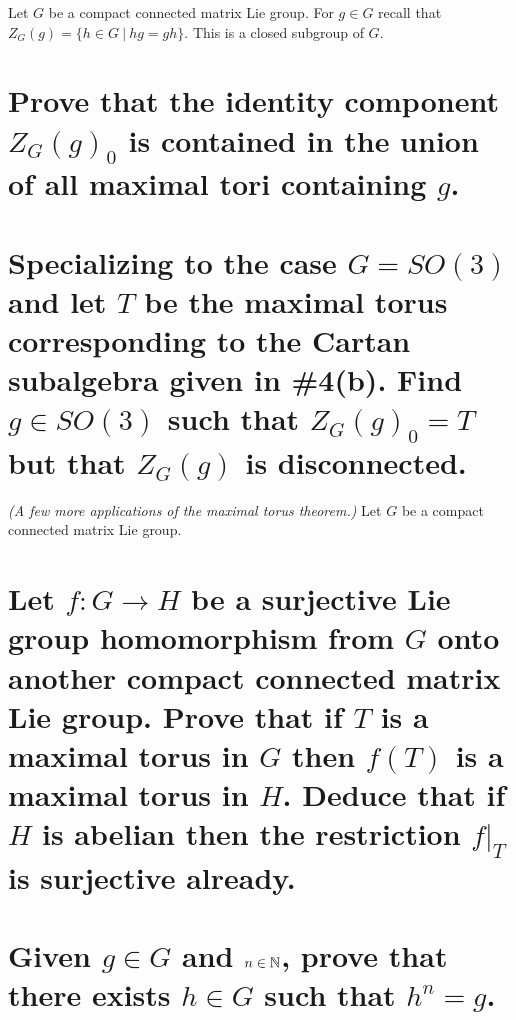 \documentclass[
	pages,
	boxes,
	color=WildStrawberry
]{homework}
\begin{document}
\begin{problem}
Let $G$ be a compact connected matrix Lie group. For $g \in G$ recall that $Z_G(g) = \{h \in G\ |\ hg = gh\}$. This is a closed subgroup of $G$.
\begin{parts}
	\part{Prove that the identity component $Z_G(g)_0$ is contained in the union of all maximal tori containing $g$.}\label{part:7a}
	\part{Specializing to the case $G = SO(3) $ and let $T$ be the maximal torus corresponding to the Cartan subalgebra given in \#4(b). Find $g \in SO(3)$ such that $Z_{G}(g)_{0} = T$ but that $Z_{G}(g)$ is disconnected.}\label{part:7b}
\end{parts}
\end{problem}


\begin{problem}
\textit{(A few more applications of the maximal torus theorem.)} Let $G$ be a compact connected matrix Lie group.
\begin{parts}
	\part{Let $f: G \to H$ be a surjective Lie group homomorphism from $G$ onto another compact connected matrix Lie group. Prove that if $T$ is a maximal torus in $G$ then $f(T)$ is a maximal torus in $H$. Deduce that if $H$ is abelian then the restriction $f|_{T}$ is surjective already.}\label{part:8a}
	\part{Given $g \in G$ and $n \in \mathbb{N}$, prove that there exists $h \in G$ such that $h^n = g$.}\label{part:8b}
\end{parts}

\end{problem}

\begin{solution}
\end{solution}
\end{document}
